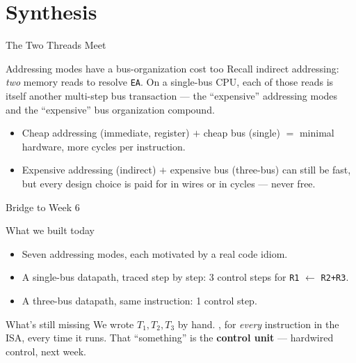\documentclass[aspectratio=169]{beamer}
\begin{document}
\section{Synthesis}

\begin{frame}{The Two Threads Meet}
  \begin{block}{Addressing modes have a bus-organization cost too}
    Recall indirect addressing: \emph{two} memory reads to resolve \texttt{EA}.
    On a single-bus CPU, each of those reads is itself another multi-step bus
    transaction --- the ``expensive'' addressing modes and the ``expensive''
    bus organization compound.
  \end{block}
  \begin{itemize}
    \item Cheap addressing (immediate, register) $+$ cheap bus (single) $=$ minimal
      hardware, more cycles per instruction.
    \item Expensive addressing (indirect) $+$ expensive bus (three-bus) can still
      be fast, but every design choice is paid for in wires or in cycles ---
      never free.
  \end{itemize}
\end{frame}

\begin{frame}{Bridge to Week 6}
  \begin{block}{What we built today}
    \begin{itemize}
      \item Seven addressing modes, each motivated by a real code idiom.
      \item A single-bus datapath, traced step by step: 3 control steps for
        \texttt{R1} $\gets$ \texttt{R2+R3}.
      \item A three-bus datapath, same instruction: 1 control step.
    \end{itemize}
  \end{block}
  \begin{exampleblock}{What's still missing}
    We wrote $T_1, T_2, T_3$ by hand. , for \emph{every} instruction in the ISA, every time it runs.
    That ``something'' is the \textbf{control unit} --- hardwired control, next week.
  \end{exampleblock}
\end{frame}
\end{document}
